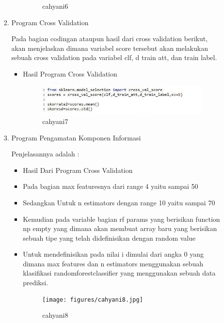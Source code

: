 \begin{enumerate}
\begin{itemize}
\begin{enumerate}
\begin{itemize}
\begin{figure}[!hbtp]
\caption{cahyani6}
\label{cahyani6}
\end{figure}
\par
\end{itemize}
\par
\par
\item Program Cross Validation
\par Pada bagian codingan ataupun hasil dari cross validation berikut, akan menjelaskan dimana variabel score tersebut akan melakukan sebuah cross validation pada variabel clf, d train att, dan train label. 
\begin{itemize}
\item Hasil Program Cross Validation
\begin{figure}[!hbtp]
\centering
\includegraphics[scale=0.3]{figures/cahyani7.jpg}
\caption{cahyani7}
\label{cahyani7}
\end{figure}
\par
\end{itemize}
\par
\par
\item Program Pengamatan Komponen Informasi
\par Penjelasannya adalah :
\begin{itemize}
\item Hasil Dari Program Cross Validation
\par
\item Pada bagian max featuresnya dari range 4 yaitu sampai 50
\item Sedangkan Untuk n estimators dengan range 10 yaitu sampai 70
\item Kemudian pada variable bagian rf params yang berisikan function np empty yang dimana akan membuat array baru yang berisikan sebuah tipe yang telah didefinisikan dengan random value
\item Untuk mendefinisikan pada nilai i dimulai dari angka 0 yang dimana max features dan n estimators menggunakan sebuah  klasifikasi randomforestclassifier yang menggunakan sebuah data prediksi.
\begin{figure}[!hbtp]
\centering
\texttt{[image: figures/cahyani8.jpg]}
\caption{cahyani8}
\label{cahyani8}
\end{figure}
\par
\par
\end{itemize}
\par
\par
\par
\end{enumerate}


\end{itemize}
\end{enumerate}

